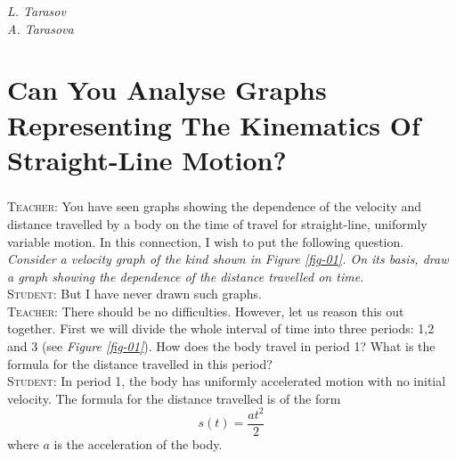 \documentclass[a4paper,sfsidenotes]{tufte-book}
\begin{document}
\begin{flushright}
\textit{L. Tarasov}\\
\textit{A. Tarasova}
\end{flushright}

\mainmatter

\chapter{Can You Analyse Graphs Representing The Kinematics Of Straight-Line Motion?}
\label{analysing-graphs}
\paragraph{}
\textsc{Teacher:} You have seen graphs showing the dependence of the velocity and distance travelled by a body on the time of travel for straight-line, uniformly variable motion. In this connection,  I wish to put the following question. 
\emph{Consider a velocity graph of the kind shown in \emph{Figure \ref{fig-01}}. On its basis, draw a graph showing the dependence of the distance travelled on time.} \\
\textsc{Student:} But I have never drawn such graphs. \\
\textsc{Teacher:} There should be no difficulties. However, let us reason this out together. First we will divide the whole interval of time into three periods: 1,2 and 3 (see \emph{Figure \ref{fig-01}}). How does the body travel in period 1? What is the formula for the distance travelled in this period?\\
\textsc{Student:} In period 1, the body has uniformly accelerated motion with no initial velocity. The formula for the distance travelled is of the form
\begin{equation}
s(t) = \frac{at^2}{2}
\label{eq-001}
\end{equation}
where $a$ is the acceleration of the body.
\end{document}
